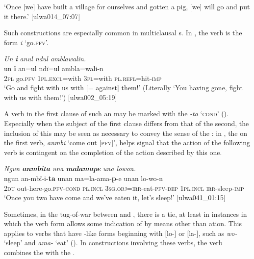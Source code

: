 \glt `Once [we] have built a village for ourselves and gotten a pig, [we] will go and put it there.’ [ulwa014\_07:07]
\z

Such   constructions are especially common in multiclausal s. In , the  verb is the  form \textit{i} ‘go.\textsc{pfv’.}

\ea%
    \label{ex:verbs:57}
          \textit{Un} \textbf{\textit{i}} \textit{anul ndul amblawalin.}\\
\gll un  \textbf{i}    an=ul        ndï=ul    ambla=wali-n\\
    2\textsc{pl}  go.\textsc{pfv}  1\textsc{pl.excl}=with  3\textsc{pl}=with  \textsc{pl.refl}=hit-\textsc{imp}\\
\glt `Go and fight with us with [= against] them!’ (Literally ‘You having gone, fight with us with them!’) [ulwa002\_05:19]
\z

A verb in the first clause of such an  may be marked with the   \textit{-ta} ‘\textsc{cond}’ (). Especially when the subject of the first clause differs from that of the second, the inclusion of this  may be seen as necessary to convey the   sense of the : in , the   on the first verb, \textit{anmbi} ‘come out [\textsc{pfv]}’, helps signal that the action of the following verb is contingent on the completion of the action described by this one.

\ea%
    \label{ex:verbs:58}


          \textit{Ngun \textbf{anmbita} una \textbf{malamape} una lowon.}\\
    \gll ngun  an-mbï-i-\textbf{ta}        unan    ma=la{}-ama-\textbf{p}{}-e      unan    lo-wo-n\\
    2\textsc{du}  out-here-go.\textsc{pfv-cond}  \textsc{pl.incl}    3\textsc{sg.obj}=\textsc{irr}{}-eat-\textsc{pfv-dep}  1\textsc{pl.incl}  \textsc{irr}{}-sleep-\textsc{imp}\\


\glt `Once you two have come and we’ve eaten it, let’s sleep!’ [ulwa041\_01:15]
\z

Sometimes, in the tug-of-war between   and  , there is a  tie, at least in instances in which the verb form allows some indication of   by means other than ation. This applies to verbs that have -like  forms beginning with [lo-] or [la-], such as \textit{wo-} ‘sleep’ and \textit{ama-} ‘eat’ (). In   constructions involving these verbs, the verb combines the   with the  .

